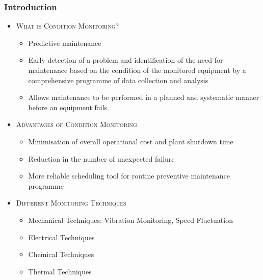 \documentclass[9pt]{beamer}
\begin{document}
\begin{frame}
\frametitle{Introduction}

\begin{itemize}
\item \textsc{What is Condition Monitoring?}
    \begin{itemize} 
    \item Predictive maintenance
    \item Early detection of a problem and identification of the need for maintenance based on the condition of the monitored equipment by a comprehensive programme of data collection and analysis
    \item Allows maintenance to be performed in a planned and systematic manner before an equipment fails.
    \end{itemize}
\item \textsc{Advantages of Condition Monitoring}
    \begin{itemize}
    \item Minimisation of overall operational cost and plant shutdown time
    \item Reduction in the number of unexpected failure
    \item More reliable scheduling tool for routine preventive maintenance programme
    \end{itemize}
\item \textsc{Different Monitoring Techniques}
    \begin{itemize}
    \item Mechanical Techniques: Vibration Monitoring, Speed Fluctuation
    \item Electrical Techniques
    \item Chemical Techniques
    \item Thermal Techniques
    \end{itemize}
\end{itemize}
\end{frame}
\end{document}
